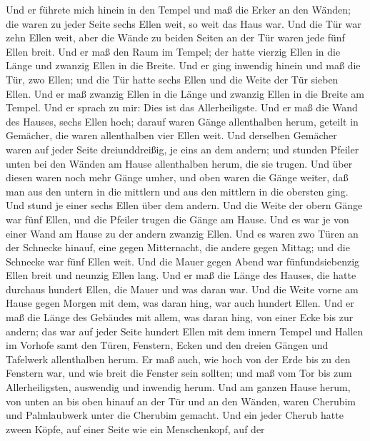  Und er führete mich hinein in den Tempel und maß die Erker
an den Wänden; die waren zu jeder Seite sechs Ellen weit, so weit das
Haus war.  Und die Tür war zehn Ellen weit, aber die Wände
zu beiden Seiten an der Tür waren jede fünf Ellen breit. Und er maß den
Raum im Tempel; der hatte vierzig Ellen in die Länge und zwanzig Ellen
in die Breite.  Und er ging inwendig hinein und maß die Tür,
zwo Ellen; und die Tür hatte sechs Ellen und die Weite der Tür sieben
Ellen.  Und er maß zwanzig Ellen in die Länge und zwanzig
Ellen in die Breite am Tempel. Und er sprach zu mir: Dies ist das
Allerheiligste.  Und er maß die Wand des Hauses, sechs Ellen
hoch; darauf waren Gänge allenthalben herum, geteilt in Gemächer, die
waren allenthalben vier Ellen weit.  Und derselben Gemächer
waren auf jeder Seite dreiunddreißig, je eins an dem andern; und stunden
Pfeiler unten bei den Wänden am Hause allenthalben herum, die sie
trugen.  Und über diesen waren noch mehr Gänge umher, und
oben waren die Gänge weiter, daß man aus den untern in die mittlern und
aus den mittlern in die obersten ging.  Und stund je einer
sechs Ellen über dem andern.  Und die Weite der obern Gänge
war fünf Ellen, und die Pfeiler trugen die Gänge am Hause. 
Und es war je von einer Wand am Hause zu der andern zwanzig Ellen.
 Und es waren zwo Türen an der Schnecke hinauf, eine gegen
Mitternacht, die andere gegen Mittag; und die Schnecke war fünf Ellen
weit.  Und die Mauer gegen Abend war fünfundsiebenzig Ellen
breit und neunzig Ellen lang.  Und er maß die Länge des
Hauses, die hatte durchaus hundert Ellen, die Mauer und was daran war.
 Und die Weite vorne am Hause gegen Morgen mit dem, was
daran hing, war auch hundert Ellen.  Und er maß die Länge
des Gebäudes mit allem, was daran hing, von einer Ecke bis zur andern;
das war auf jeder Seite hundert Ellen mit dem innern Tempel und Hallen
im Vorhofe  samt den Türen, Fenstern, Ecken und den dreien
Gängen und Tafelwerk allenthalben herum.  Er maß auch, wie
hoch von der Erde bis zu den Fenstern war, und wie breit die Fenster
sein sollten; und maß vom Tor bis zum Allerheiligsten, auswendig und
inwendig herum.  Und am ganzen Hause herum, von unten an
bis oben hinauf an der Tür und an den Wänden, waren Cherubim und
Palmlaubwerk unter die Cherubim gemacht.  Und ein jeder
Cherub hatte zween Köpfe, auf einer Seite wie ein Menschenkopf, auf der

